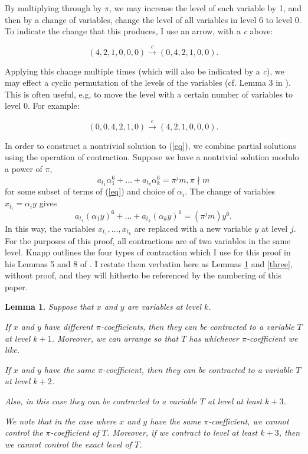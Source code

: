 \documentclass[draft]{publmathdeb}
\newtheorem{lemma}{Lemma}
\begin{document}
By multiplying through by $\pi$, we may increase the level of each variable by 1, and then by a change of variables, change the level of all variables in level 6 to level 0.  To indicate the change that this produces, I use an arrow, with a \textit{c} above:

$$ (4,2,1,0,0,0) \xrightarrow{c} (0,4,2,1,0,0).$$

Applying this change multiple times (which will also be indicated by a  \textit{c}), we may effect a cyclic permutation of the levels of the variables (cf. Lemma 3 in \cite{knapp2016solubility}).  This is often useful, e.g, to move the level with a certain number of variables to level 0.  For example:

$$ (0,0,4,2,1,0) \xrightarrow{c} (4,2,1,0,0,0).$$

In order to construct a nontrivial solution to (\ref{eq}), we combine partial solutions using the operation of contraction.  Suppose we have a nontrivial solution modulo a power of $\pi$,  $$a_{t_1}\alpha_1^6 + \ldots + a_{t_k}\alpha_k^6 = \pi^j m, \pi \nmid m$$ for some subset of terms of (\ref{eq}) and choice of $\alpha_i$.  The change of variables $x_{t_i} = \alpha_i y$ gives $$a_{t_1}(\alpha_1 y)^6 + \ldots + a_{t_k}(\alpha_k y)^6 = (\pi^j m )y^6.$$  In this way, the variables $x_{t_1}, \ldots, x_{t_k}$ are replaced with a new variable $y$ at level $j.$  For the purposes of this proof, all contractions are of two variables in the same level.  Knapp outlines the four types of contraction which I use for this proof in his Lemmas 5 and 8 of \cite{knapp2016solubility}. I restate them verbatim here as Lemmas \ref{two} and \ref{three}, without proof, and they will hitherto be referenced by the numbering of this paper.

\begin{lemma}
\label{two}
Suppose that $x$ and $y$ are variables at level $k$.

If $x$ and $y$ have different $\pi$-coefficients, then they can be contracted to a variable $T$ at level $k + 1$. Moreover, we can arrange so that $T$ has whichever $\pi$-coefficient we like.

If $x$ and $y$ have the same $\pi$-coefficient, then they can be contracted to a variable $T$ at level $k + 2$.

Also, in this case they can be contracted to a variable $T$ at level at least $k + 3$.
  
We note that in the case where $x$ and $y$ have the same $\pi$-coefficient, we cannot control the $\pi$-coefficient of $T$. Moreover, if we contract to level at least $k + 3$, then we cannot control the exact level of $T$.
\end{lemma}
\end{document}
